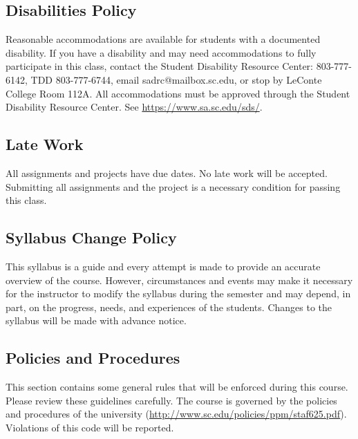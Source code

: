 \documentclass[11pt]{article}
\begin{document}
\subsection*{Disabilities Policy}

Reasonable accommodations are available for students with a documented disability. If you have a disability and may need accommodations to fully participate in this class, contact the Student Disability Resource Center:  803-777-6142, TDD 803-777-6744, email sadrc@mailbox.sc.edu, or stop by LeConte College Room 112A. All accommodations must be approved through the Student Disability Resource Center. See \url{https://www.sa.sc.edu/sds/}.

\subsection*{Late Work}

All assignments and projects have due dates. No late work will be accepted. Submitting all assignments and the project is a necessary condition for passing this class.

\subsection*{Syllabus Change Policy}

This syllabus is a guide and every attempt is made to provide an accurate overview of the course. However, circumstances and events may make it necessary for the instructor to modify the syllabus during the semester and may depend, in part, on the progress, needs, and experiences of the students. Changes to the syllabus will be made with advance notice.

\subsection*{Policies and Procedures}

This section contains some general rules that will be enforced during this course. Please review these guidelines carefully. The course is governed by the policies and procedures of the university (\url{http://www.sc.edu/policies/ppm/staf625.pdf}). Violations of this code will be reported.


\newpage
\end{document}
